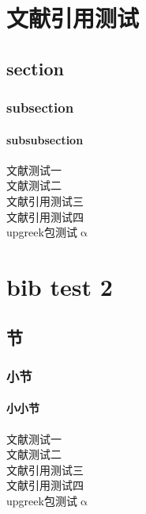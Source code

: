 \chapter{文献引用测试}
\section{section}
\subsection{subsection}
\subsubsection{subsubsection}
文献测试一\cite{xiu2010numerical}\\
文献测试二\cite{li2006numerical}\\
文献引用测试三\cite{xia2009real}\\
文献引用测试四\cite{xiu2002wiener}\\
upgreek包测试$\upalpha$


\chapter{bib test 2}
\section{节}
\subsection{小节}
\subsubsection{小小节}
文献测试一\cite{xiu2010numerical}\\
文献测试二\cite{li2006numerical}\\
文献引用测试三\cite{xia2009real}\\
文献引用测试四\cite{xiu2002wiener}\\
upgreek包测试$\upalpha$